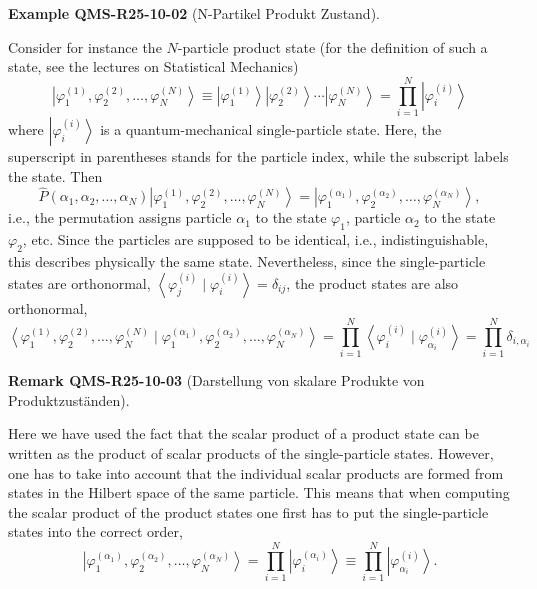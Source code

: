 \documentclass[10pt, letterpaper]{article}
\newcommand{\CustomHeading}[3]{%
  \par\medskip\noindent%
  \textbf{#1 #2} \textnormal{(#3)}.\enskip%
}
\newenvironment{REM}[2]{\begin{unitbox}\CustomHeading{Remark}{#1}{#2}}{\end{unitbox}}
\newenvironment{EXA}[2]{\begin{unitbox}\CustomHeading{Example}{#1}{#2}}{\end{unitbox}}
\begin{document}
\begin{EXA}{QMS-R25-10-02}{N-Partikel Produkt Zustand}
Consider for instance the $N$-particle product state (for the definition of such a state, see the lectures on Statistical Mechanics)
$$
\left|\varphi_{1}^{(1)}, \varphi_{2}^{(2)}, \ldots, \varphi_{N}^{(N)}\right\rangle \equiv\left|\varphi_{1}^{(1)}\right\rangle\left|\varphi_{2}^{(2)}\right\rangle \cdots\left|\varphi_{N}^{(N)}\right\rangle=\prod_{i=1}^{N}\left|\varphi_{i}^{(i)}\right\rangle
$$
where $\left|\varphi_{i}^{(i)}\right\rangle$ is a quantum-mechanical single-particle state. Here, the superscript in parentheses stands for the particle index, while the subscript labels the state. Then
$$
\hat{P}\left(\alpha_{1}, \alpha_{2}, \ldots, \alpha_{N}\right)\left|\varphi_{1}^{(1)}, \varphi_{2}^{(2)}, \ldots, \varphi_{N}^{(N)}\right\rangle=\left|\varphi_{1}^{\left(\alpha_{1}\right)}, \varphi_{2}^{\left(\alpha_{2}\right)}, \ldots, \varphi_{N}^{\left(\alpha_{N}\right)}\right\rangle,
$$
i.e., the permutation assigns particle $\alpha_{1}$ to the state $\varphi_{1}$, particle $\alpha_{2}$ to the state $\varphi_{2}$, etc. Since the particles are supposed to be identical, i.e., indistinguishable, this describes physically the same state. Nevertheless, since the single-particle states are orthonormal, $\left\langle\varphi_{j}^{(i)} \mid \varphi_{i}^{(i)}\right\rangle=\delta_{i j}$, the product states are also orthonormal,
$$
\left\langle\varphi_{1}^{(1)}, \varphi_{2}^{(2)}, \ldots, \varphi_{N}^{(N)} \mid \varphi_{1}^{\left(\alpha_{1}\right)}, \varphi_{2}^{\left(\alpha_{2}\right)}, \ldots, \varphi_{N}^{\left(\alpha_{N}\right)}\right\rangle=\prod_{i=1}^{N}\left\langle\varphi_{i}^{(i)} \mid \varphi_{\alpha_{i}}^{(i)}\right\rangle=\prod_{i=1}^{N} \delta_{i, \alpha_{i}}
$$
\end{EXA}

\begin{REM}{QMS-R25-10-03}{Darstellung von skalare Produkte von Produktzuständen}
Here we have used the fact that the scalar product of a product state can be written as the product of scalar products of the single-particle states. However, one has to take into account that the individual scalar products are formed from states in the Hilbert space of the same particle. This means that when computing the scalar product of the product states one first has to put the single-particle states into the correct order,
$$
\left|\varphi_{1}^{\left(\alpha_{1}\right)}, \varphi_{2}^{\left(\alpha_{2}\right)}, \ldots, \varphi_{N}^{\left(\alpha_{N}\right)}\right\rangle=\prod_{i=1}^{N}\left|\varphi_{i}^{\left(\alpha_{i}\right)}\right\rangle \equiv \prod_{i=1}^{N}\left|\varphi_{\alpha_{i}}^{(i)}\right\rangle .
$$
\end{REM}
\end{document}
